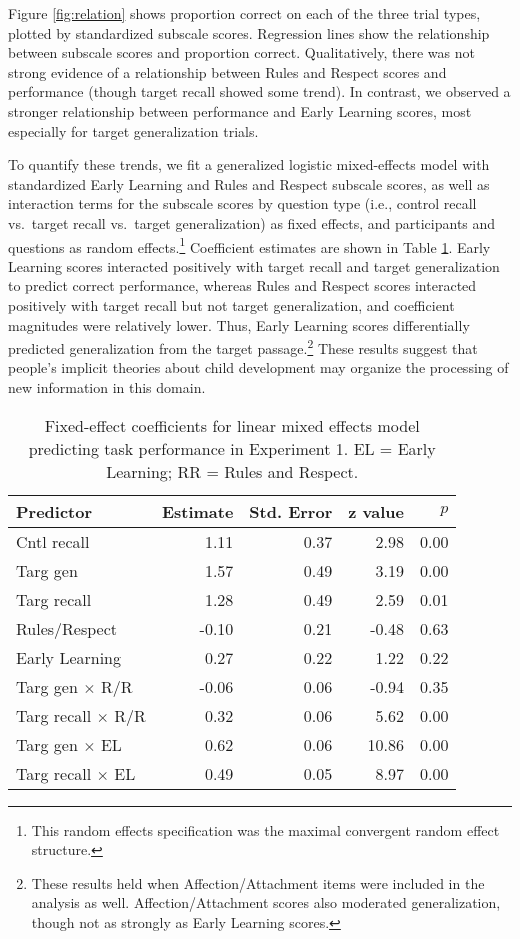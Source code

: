 \documentclass[10pt, letterpaper]{article}
\begin{document}
Figure \ref{fig:relation} shows proportion correct on each of the three
trial types, plotted by standardized subscale scores. Regression lines
show the relationship between subscale scores and proportion correct.
Qualitatively, there was not strong evidence of a relationship between
Rules and Respect scores and performance (though target recall showed
some trend). In contrast, we observed a stronger relationship between
performance and Early Learning scores, most especially for target
generalization trials.

To quantify these trends, we fit a generalized logistic mixed-effects
model with standardized Early Learning and Rules and Respect subscale
scores, as well as interaction terms for the subscale scores by question
type (i.e., control recall vs.~target recall vs.~target generalization)
as fixed effects, and participants and questions as random
effects.\footnote{This random effects specification was the maximal
  convergent random effect structure.} Coefficient estimates are shown
in Table \ref{tab:lmer}. Early Learning scores interacted positively
with target recall and target generalization to predict correct
performance, whereas Rules and Respect scores interacted positively with
target recall but not target generalization, and coefficient magnitudes
were relatively lower. Thus, Early Learning scores differentially
predicted generalization from the target passage.\footnote{These results
  held when Affection/Attachment items were included in the analysis as
  well. Affection/Attachment scores also moderated generalization,
  though not as strongly as Early Learning scores.} These results
suggest that people's implicit theories about child development may
organize the processing of new information in this domain.

\begin{table}[t]
\centering
\begin{tabular}{lrrrr}
  \hline
Predictor & Estimate & Std. Error & z value & $p$ \\ 
  \hline
  Cntl recall & 1.11 & 0.37 & 2.98 & 0.00 \\ 
  Targ gen & 1.57 & 0.49 & 3.19 & 0.00 \\ 
  Targ recall & 1.28 & 0.49 & 2.59 & 0.01 \\ 
  Rules/Respect & -0.10 & 0.21 & -0.48 & 0.63 \\ 
  Early Learning & 0.27 & 0.22 & 1.22 & 0.22 \\ 
  Targ gen $\times$ R/R & -0.06 & 0.06 & -0.94 & 0.35 \\ 
  Targ recall $\times$ R/R& 0.32 & 0.06 & 5.62 & 0.00 \\ 
  Targ gen $\times$ EL & 0.62 & 0.06 & 10.86 & 0.00 \\ 
  Targ recall $\times$ EL & 0.49 & 0.05 & 8.97 & 0.00 \\ 
   \hline
\end{tabular}
\caption{Fixed-effect coefficients for linear mixed effects model predicting task performance in Experiment 1. EL = Early Learning; RR = Rules and Respect.\label{tab:lmer}} 
\end{table}
\end{document}
